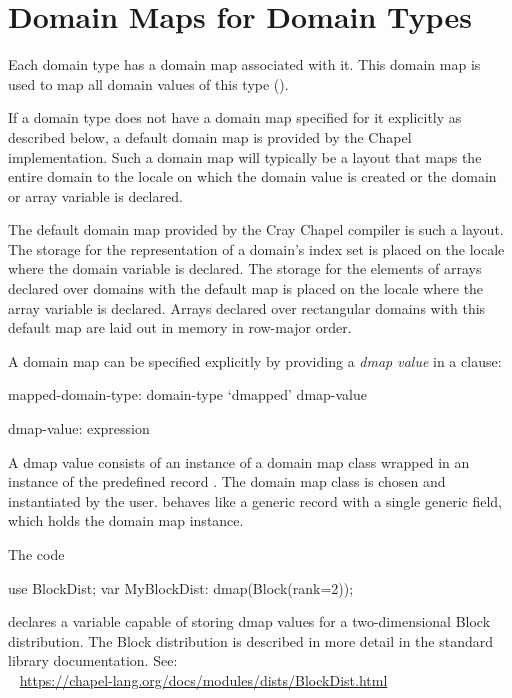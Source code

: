 \section{Domain Maps for Domain Types}
\label{Domain_Maps_For_Types}

Each domain type has a domain map associated with it.
This domain map is used to map all domain values of this type
().

If a domain type does not have a domain map specified for it
explicitly as described below,
a default domain map is provided by the Chapel implementation.
Such a domain map will typically be a layout that maps the entire domain
to the locale on which the domain value is created or
the domain or array variable is declared.

\begin{craychapel}
The default domain map provided by the Cray Chapel compiler
is such a layout. The storage for the representation of a domain's
index set is placed on the locale where the domain variable is declared.
The storage for the elements of arrays declared over domains with
the default map is placed on the locale where the array variable
is declared.
Arrays declared over rectangular domains with this default map
are laid out in memory in row-major order.
\end{craychapel}

\pagebreak
{}
A domain map can be specified explicitly by
providing a \emph{dmap value} in a  clause:

\begin{syntax}
mapped-domain-type:
  domain-type `dmapped' dmap-value

dmap-value:
  expression
\end{syntax}

A dmap value consists of an instance of a domain map class
wrapped in an instance of the predefined record .
The domain map class is chosen and instantiated by the user.
 behaves like a generic record with a single generic field,
which holds the domain map instance.

\begin{example}
The code
\begin{chapel}
use BlockDist;
var MyBlockDist: dmap(Block(rank=2));
\end{chapel}
declares a variable capable of storing dmap values
for a two-dimensional Block distribution.
The Block distribution is described in more detail
in the standard library documentation. See:
\\ %
\mbox{$$ $$ $$} %
\url{https://chapel-lang.org/docs/modules/dists/BlockDist.html}
\end{example}


